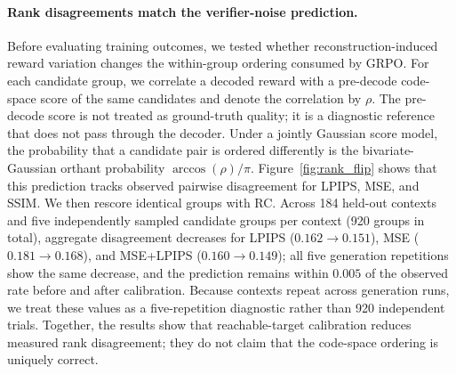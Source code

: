 \documentclass[letterpaper]{article} %
\begin{document}
\paragraph{Rank disagreements match the verifier-noise prediction.}
Before evaluating training outcomes, we tested whether reconstruction-induced reward variation changes the within-group ordering consumed by GRPO. For each candidate group, we correlate a decoded reward with a pre-decode code-space score of the same candidates and denote the correlation by $\rho$. The pre-decode score is not treated as ground-truth quality; it is a diagnostic reference that does not pass through the decoder. Under a jointly Gaussian score model, the probability that a candidate pair is ordered differently is the bivariate-Gaussian orthant probability $\arccos(\rho)/\pi$. Figure~\ref{fig:rank_flip} shows that this prediction tracks observed pairwise disagreement for LPIPS, MSE, and SSIM. We then rescore identical groups with RC. Across 184 held-out contexts and five independently sampled candidate groups per context (920 groups in total), aggregate disagreement decreases for LPIPS ($0.162\rightarrow0.151$), MSE ($0.181\rightarrow0.168$), and MSE+LPIPS ($0.160\rightarrow0.149$); all five generation repetitions show the same decrease, and the prediction remains within $0.005$ of the observed rate before and after calibration. Because contexts repeat across generation runs, we treat these values as a five-repetition diagnostic rather than 920 independent trials. Together, the results show that reachable-target calibration reduces measured rank disagreement; they do not claim that the code-space ordering is uniquely correct.
\end{document}
